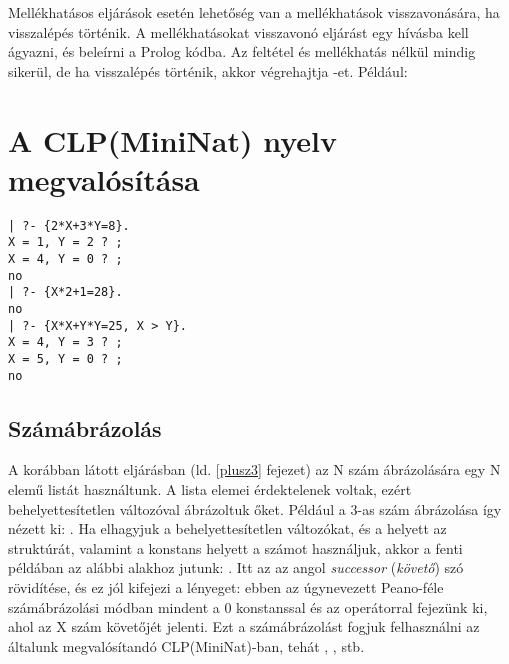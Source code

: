 
Mellékhatásos eljárások esetén lehetőség van a mellékhatások visszavonására,
ha visszalépés történik. A mellékhatásokat visszavonó eljárást egy 
hívásba kell ágyazni, és beleírni a Prolog kódba. Az  feltétel
és mellékhatás nélkül mindig sikerül, de ha visszalépés történik, akkor
végrehajtja -et. Például:


\section{A CLP(MiniNat) nyelv megvalósítása}

\begin{verbatim}
| ?- {2*X+3*Y=8}.
X = 1, Y = 2 ? ; 
X = 4, Y = 0 ? ;
no
| ?- {X*2+1=28}.
no
| ?- {X*X+Y*Y=25, X > Y}.
X = 4, Y = 3 ? ; 
X = 5, Y = 0 ? ;
no
\end{verbatim}

\subsection{Számábrázolás}

A korábban látott  eljárásban (ld. \ref{plusz3} fejezet) az
N szám ábrázolására egy N elemű listát használtunk. A lista elemei érdektelenek
voltak, ezért behelyettesítetlen változóval ábrázoltuk őket. Például a 
3-as szám ábrázolása így nézett ki: .
Ha elhagyjuk a behelyettesítetlen változókat, és a  helyett az
 struktúrát, valamint a \cd{[]} konstans helyett a  számot
használjuk, akkor a fenti példában az alábbi alakhoz jutunk: .
Itt az  az angol \emph{successor} (\emph{követő}) szó rövidítése,
és ez jól kifejezi a lényeget: ebben az úgynevezett Peano-féle számábrázolási
módban mindent a 0 konstanssal és az  operátorral fejezünk ki, ahol
 az X szám követőjét jelenti. Ezt a számábrázolást fogjuk felhasználni
az általunk megvalósítandó CLP(MiniNat)-ban, tehát , ,
 stb.

